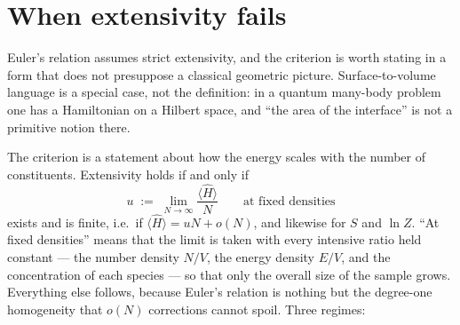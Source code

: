\documentclass[10pt,a4paper]{article}
\theoremstyle{remark}
\begin{document}
\section{When extensivity fails}
\label{app:extensivity}

Euler's relation assumes strict extensivity, and the criterion is worth stating
in a form that does not presuppose a classical geometric picture.
Surface-to-volume language is a special case, not the definition: in a quantum
many-body problem one has a Hamiltonian on a Hilbert space, and ``the area of the
interface'' is not a primitive notion there.

The criterion is a statement about how the energy scales with the number of
constituents. Extensivity holds if and only if
\[
u\;:=\;\lim_{N\to\infty}\frac{\langle\hat H\rangle}{N}
\qquad\text{at fixed densities}
\]
exists and is finite, i.e.\ if $\langle\hat H\rangle=uN+o(N)$, and likewise for
$S$ and $\ln Z$. ``At fixed densities'' means that the limit is taken with every
intensive ratio held constant --- the number density $N/V$, the energy density
$E/V$, and the concentration of each species --- so that only the overall size of
the sample grows. Everything else follows, because Euler's relation is nothing
but the degree-one homogeneity that $o(N)$ corrections cannot spoil. Three
regimes:
\end{document}
